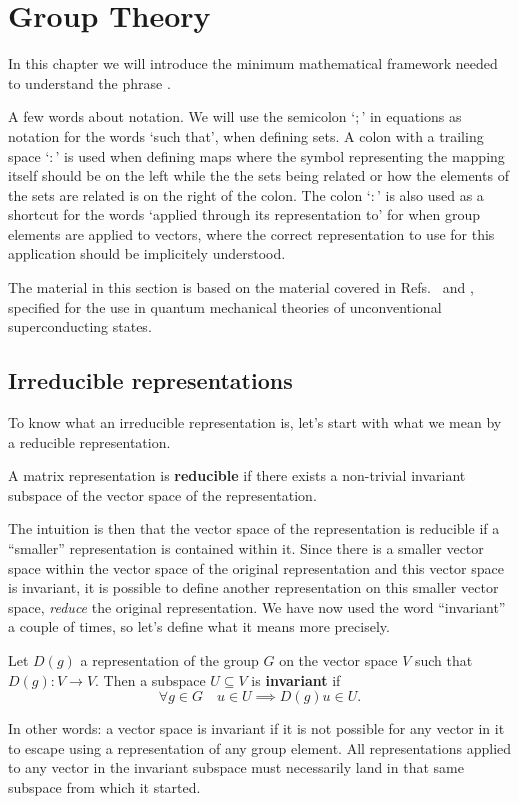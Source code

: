 \chapter{Group Theory}
\label{chap:Group}

In this chapter we will introduce the minimum mathematical framework needed to
understand the phrase .

A few words about notation. We will use the semicolon `$;$' in equations as notation for the words `such that', \eg when defining sets.
A colon with a trailing space `$\colon$' is used when defining maps where the symbol representing the mapping itself should be on the left while the the sets
being related or how the elements of the sets are related is on the right of the colon. The colon `$:$' is also used as a shortcut for the
words `applied through its representation to' for when group elements are applied to vectors, where the correct representation to use
for this application should be implicitely understood.

The material in this section is based on the material covered in Refs.~\cite{Inui90} and \cite{NegeleOrland98}, specified for the use in
quantum mechanical theories of unconventional superconducting states.

\section{Irreducible representations}

To know what an irreducible representation is, let's start with what we mean by a reducible representation.
\begin{defi}
    A matrix representation is \textbf{reducible} if there exists a non-trivial invariant subspace of the vector space of the representation.
\end{defi}
The intuition is then that the vector space of the representation is reducible if a ``smaller'' representation is contained within it. Since
there is a smaller vector space within the vector space of the original representation and this vector space is invariant, it is possible
to define another representation on this smaller vector space, \ie\emph{reduce} the original representation. We have now used the word
``invariant'' a couple of times, so let's define what it means more precisely.

\begin{defi}
    Let $D(g)$ a representation of the group $G$ on the vector space $V$ such that $D(g)\colon V\rightarrow V$. Then
    a subspace $U\subseteq V$ is \textbf{invariant} if 
    \begin{equation}
        \label{eq:Group:Irr:invariantDef}
        \forall g\in G\quad u\in U \implies D(g)u\in U.
    \end{equation}
\end{defi}
In other words: a vector space is invariant if it is not possible for any vector in it to escape using a representation of any group element.
All representations applied to any vector in the invariant subspace must necessarily land in that same subspace from which it started.

